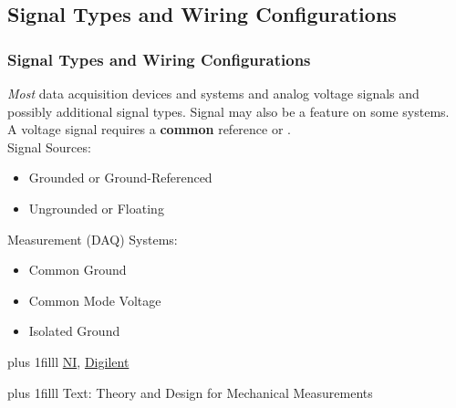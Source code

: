 \documentclass[fleqn]{beamer} %
\newcommand{\sectionIIsubsectionItitle}{Signal Types and Wiring Configurations}
\newcommand{\btVFill}{\vskip0pt plus 1filll}
\begin{document}
		\subsection{\sectionIIsubsectionItitle}\label{sectionIIsubsectionI}

			\begin{frame}[label=sectionIIsubsectionI]
				\frametitle{\sectionIIsubsectionItitle} \scriptsize

				\bigskip	

				{\it Most} data acquisition devices and systems \underline{\hspace{20mm}} and \underline{\hspace{20mm}} {\BL analog} voltage signals and possibly additional signal types. Signal \underline{\hspace{20mm}} may also be a feature on some systems. \vspace{5mm}\\

				A voltage signal requires a {\bf common} reference or \underline{\hspace{20mm}}.	\vspace{2mm}\\

				Signal Sources:
				\begin{itemize}
					\item Grounded or Ground-Referenced	\vspace{2mm}\\

					\item Ungrounded or Floating \vspace{2mm}\\		

				\end{itemize}	
				\vspace*{5mm}

				Measurement (DAQ) Systems:
				\begin{itemize}
					\item Common Ground \vspace{2mm}\\

					\item Common Mode Voltage \vspace{2mm}\\

					\item Isolated Ground \vspace{2mm}\\

				\end{itemize}
				

				\btVFill
				\tiny{\href{https://www.ni.com/en/support/documentation/supplemental/06/grounding-considerations---intermediate-analog-concepts.html}{NI},}
				\tiny{\href{https://digilent.com/reference/daq-and-datalogging/documents/analog-input-signal-connections-1}{Digilent}}

				\btVFill
				\tiny{Text: Theory and Design for Mechanical Measurements}
		
			\end{frame}
\end{document}
